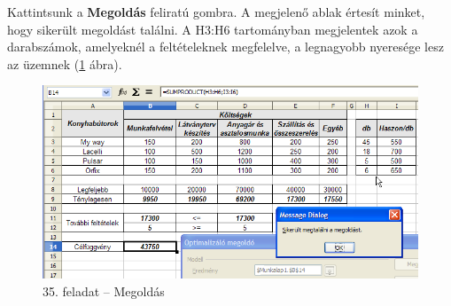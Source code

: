 Kattintsunk a \textbf{Megoldás} feliratú gombra. A megjelenő
ablak értesít minket, hogy sikerült megoldást találni. A
H3:H6 tartományban megjelentek azok a darabszámok, amelyeknél a
feltételeknek megfelelve, a legnagyobb nyeresége lesz az üzemnek
(\ref{35-feladatMegoldás} ábra).

\begin{figure}[!h]
\begin{center}
\includegraphics[width=14.999cm]{oocalcv1-img172.png}
\caption{35. feladat --  Megoldás}\label{35-feladatMegoldás}
\end{center}
\end{figure}

